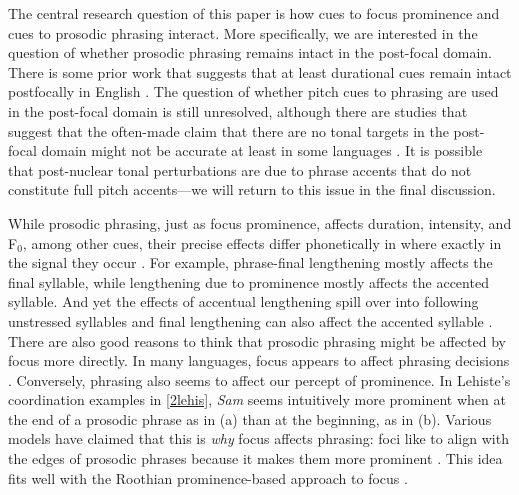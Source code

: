 \documentclass[preprint,review,12pt,authoryear,times]{elsarticle}
\begin{document}
The central research question of this paper is how cues to focus prominence and cues to prosodic phrasing interact. More specifically, we are interested in the question of whether prosodic phrasing remains intact in the post-focal domain.  There is some prior work that suggests that at least durational cues remain intact postfocally in English \citep{norcl05}  \citep[see][for relevant results in other languages]{jun00, sugah03, ishih03, ishih16, kugle17}.  The question of whether pitch cues to phrasing are used in the post-focal domain is still unresolved, although  there are studies that suggest that the often-made claim that there are no tonal targets in the post-focal domain might not be accurate at least in some languages \citep{xu05,  kugle17}. It is possible that  post-nuclear tonal perturbations are due to phrase accents that do not constitute full pitch accents---we will return to this issue in the final discussion.

While prosodic phrasing, just as focus prominence, affects duration, intensity, and F$_0$, among other cues, their precise effects differ phonetically in where exactly in the signal they occur \citep{edwar91, beckm92b, cho09, cho11}. For example, phrase-final lengthening mostly affects the final syllable, while lengthening due to prominence mostly affects the accented syllable. And yet the effects of accentual lengthening spill over into following unstressed syllables \citep{turk97} and final lengthening can also affect the accented syllable \citep{turk07}. There are also good reasons to think that prosodic phrasing might be affected by focus more directly. In many languages, focus appears to affect phrasing decisions \citep[][and references therein]{fery13}. Conversely, phrasing also seems to affect our percept of prominence. In Lehiste's coordination examples in \ref{2lehis}, {\em Sam} seems intuitively more prominent when at the end of a prosodic phrase as in (a) than at the beginning, as in (b). Various models have claimed that this is {\em why} focus affects phrasing: foci like to align with the edges of prosodic phrases because it makes them more prominent \citep{truck99,burin10typology}. This idea fits well with the Roothian prominence-based approach to focus \citep[but see][for a different perspective]{fery13}.  
\end{document}
